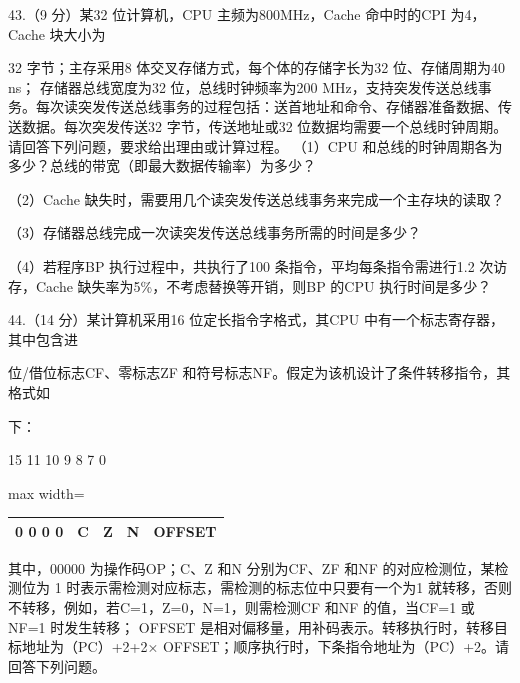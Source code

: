 \documentclass[UTF8,11pt]{ctexart}
\begin{document}
43.（9 分）某32 位计算机，CPU 主频为800MHz，Cache 命中时的CPI 为4，Cache 块大小为


32 字节；主存采用8 体交叉存储方式，每个体的存储字长为32 位、存储周期为40 ns； 存储器总线宽度为32 位，总线时钟频率为200 MHz，支持突发传送总线事务。每次读突发传送总线事务的过程包括：送首地址和命令、存储器准备数据、传送数据。每次突发传送32 字节，传送地址或32 位数据均需要一个总线时钟周期。请回答下列问题，要求给出理由或计算过程。 （1）CPU 和总线的时钟周期各为多少？总线的带宽（即最大数据传输率）为多少？


（2）Cache 缺失时，需要用几个读突发传送总线事务来完成一个主存块的读取？


（3）存储器总线完成一次读突发传送总线事务所需的时间是多少？


（4）若程序BP 执行过程中，共执行了100 条指令，平均每条指令需进行1.2 次访存，Cache 缺失率为5\%，不考虑替换等开销，则BP 的CPU 执行时间是多少？


44.（14 分）某计算机采用16 位定长指令字格式，其CPU 中有一个标志寄存器，其中包含进


位/借位标志CF、零标志ZF 和符号标志NF。假定为该机设计了条件转移指令，其格式如


下：


15 11 10 9 8 7 0


\begin{center}\begin{adjustbox}{max width=\linewidth}\begin{tabular}{|>{\raggedright\arraybackslash}p{\dimexpr(\linewidth-10\tabcolsep-6\arrayrulewidth)/5\relax}|>{\raggedright\arraybackslash}p{\dimexpr(\linewidth-10\tabcolsep-6\arrayrulewidth)/5\relax}|>{\raggedright\arraybackslash}p{\dimexpr(\linewidth-10\tabcolsep-6\arrayrulewidth)/5\relax}|>{\raggedright\arraybackslash}p{\dimexpr(\linewidth-10\tabcolsep-6\arrayrulewidth)/5\relax}|>{\raggedright\arraybackslash}p{\dimexpr(\linewidth-10\tabcolsep-6\arrayrulewidth)/5\relax}|}\hline
0 0 0 0 0 & C & Z & N & OFFSET\\\hline\end{tabular}\end{adjustbox}\end{center}

其中，00000 为操作码OP；C、Z 和N 分别为CF、ZF 和NF 的对应检测位，某检测位为 1 时表示需检测对应标志，需检测的标志位中只要有一个为1 就转移，否则不转移，例如，若C=1，Z=0，N=1，则需检测CF 和NF 的值，当CF=1 或NF=1 时发生转移； OFFSET 是相对偏移量，用补码表示。转移执行时，转移目标地址为（PC）+2+2× OFFSET；顺序执行时，下条指令地址为（PC）+2。请回答下列问题。
\end{document}
